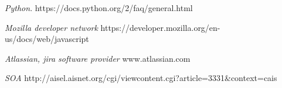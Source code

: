 \begin{thebibliography}{9}
\textit{Python}.
https://docs.python.org/2/faq/general.html

\textit{Mozilla developer network}
https://developer.mozilla.org/en-us/docs/web/javascript

\textit{Atlassian, jira software provider}
www.atlassian.com

\textit{SOA}
http://aisel.aisnet.org/cgi/viewcontent.cgi?article=3331\&context=cais

\end{thebibliography}
